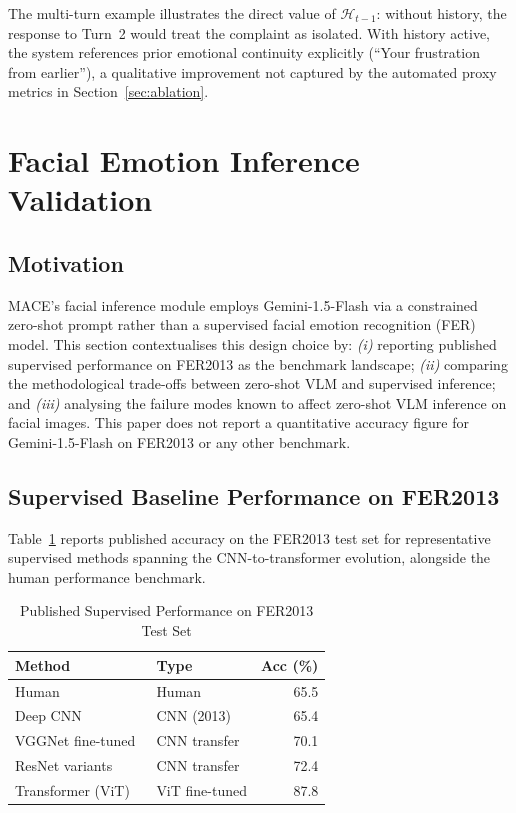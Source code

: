 \documentclass[conference]{IEEEtran}
\begin{document}
The multi-turn example illustrates the direct value of
$\mathcal{H}_{t-1}$: without history, the response to Turn~2
would treat the complaint as isolated.
With history active, the system references prior emotional
continuity explicitly (``Your frustration from earlier''),
a qualitative improvement not captured by the automated
proxy metrics in Section~\ref{sec:ablation}.

\section{Facial Emotion Inference Validation}
\label{sec:facial}

\subsection{Motivation}

MACE's facial inference module employs Gemini-1.5-Flash via
a constrained zero-shot prompt rather than a supervised
facial emotion recognition (FER) model.
This section contextualises this design choice by:
\textit{(i)} reporting published supervised performance on
FER2013 as the benchmark landscape;
\textit{(ii)} comparing the methodological trade-offs between
zero-shot VLM and supervised inference; and
\textit{(iii)} analysing the failure modes known to affect
zero-shot VLM inference on facial images.
This paper does not report a quantitative accuracy figure for
Gemini-1.5-Flash on FER2013 or any other benchmark.

\subsection{Supervised Baseline Performance on FER2013}

Table~\ref{tab:fer_baselines} reports published accuracy on
the FER2013 test set for representative supervised methods
spanning the CNN-to-transformer evolution, alongside the
human performance benchmark.

\begin{table}[htbp]
\centering
\caption{Published Supervised Performance on FER2013 Test Set}
\label{tab:fer_baselines}
\begin{tabular}{llr}
\toprule
\textbf{Method} & \textbf{Type} & \textbf{Acc (\%)} \\
\midrule
Human~\cite{goodfellow2013fer}            & Human          & 65.5 \\
Deep CNN~\cite{goodfellow2013fer}         & CNN (2013)     & 65.4 \\
VGGNet fine-tuned~\cite{li2022fer_survey} & CNN transfer   & 70.1 \\
ResNet variants~\cite{li2022fer_survey}   & CNN transfer   & 72.4 \\
Transformer (ViT)~\cite{li2022fer_survey} & ViT fine-tuned & 87.8 \\
\bottomrule
\end{tabular}
\end{table}
\end{document}

